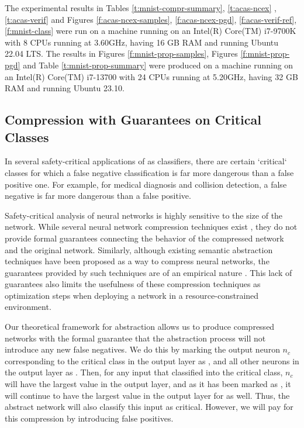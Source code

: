 The experimental results in Tables
\ref{t:mnist-compr-summary}, 
\ref{t:acas-ncex} , \ref{t:acas-verif} and Figures \ref{f:acas-ncex-samples},
\ref{f:acas-ncex-pgd}, \ref{f:acas-verif-ref},
\ref{f:mnist-class} were
run on a machine running on an Intel(R) Core(TM) i7-9700K with 8 CPUs running at
3.60GHz, having 16 GB RAM and running Ubuntu 22.04 LTS. The results in
Figures \ref{f:mnist-prop-samples}, Figures \ref{f:mnist-prop-pgd} and Table
\ref{t:mnist-prop-summary} were produced on a 
machine running on an Intel(R) Core(TM) i7-13700 with 24 CPUs running at
5.20GHz, having 32 GB RAM and running Ubuntu 23.10.

\subsection{Compression with Guarantees on Critical Classes}
\label{s:exp-mnist-comp}

In several safety-critical applications of \dnn as classifiers, there are
certain `critical` classes for which a false negative classification is far more
dangerous than a false positive one. For example, for medical diagnosis and
collision detection, a false negative is far more dangerous than a false
positive.

Safety-critical analysis of neural networks is highly sensitive to the size of
the network. While several neural network compression techniques exist 
\cite{dnn-compression}, they do not provide formal guarantees 
connecting the behavior of the compressed network and the original network.
Similarly, although existing semantic abstraction techniques have been proposed
as a way to compress neural networks, the guarantees provided by such 
techniques are of an empirical nature \cite{lin-comb-abs-jan}.
This lack of guarantees also limits the usefulness of these compression
techniques as optimization steps when deploying a network in a
resource-constrained environment. 

Our theoretical framework for abstraction allows us to produce compressed
networks with the formal guarantee that the abstraction process will not
introduce any new false negatives. We do this by marking the output neuron $n_c$
corresponding to the critical class in the output layer as \inc, and all other
neurons in the output layer as \dec.  Then, for any input that \cnc classified into
the critical class, $n_c$ will have the largest value in the
output layer, and as it has been marked as \inc, it will continue to have the
largest value in the output layer for \abs as well. Thus, the
abstract network will also classify this input as critical. However, we will pay
for this compression by introducing false positives.

